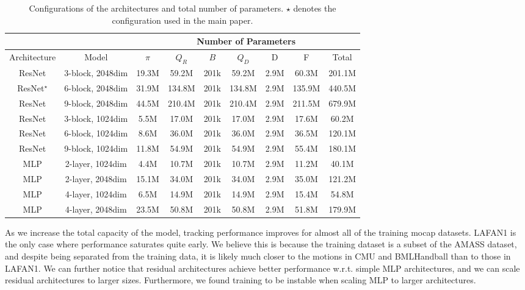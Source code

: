 \begin{table}[h]
\centering
\footnotesize
\begin{tabular}{|cc||cccccc|c|}
\hline
&& \multicolumn{7}{c|}{Number of Parameters}\\
\hline
Architecture & Model & $\pi$ & $Q_R$ & $B$ & $Q_D$ & D & F & Total\\
\hline
ResNet&3-block, 2048dim &19.3M&59.2M&201k&59.2M&2.9M&60.3M&201.1M\\
ResNet$^\star$&6-block, 2048dim &31.9M&134.8M&201k&134.8M&2.9M&135.9M&440.5M\\
ResNet&9-block, 2048dim &44.5M&210.4M&201k&210.4M&2.9M&211.5M&679.9M\\
ResNet&3-block, 1024dim &5.5M&17.0M&201k&17.0M&2.9M&17.6M&60.2M\\
ResNet&6-block, 1024dim &8.6M&36.0M&201k&36.0M&2.9M&36.5M&120.1M\\
ResNet&9-block, 1024dim &11.8M&54.9M&201k&54.9M&2.9M&55.4M&180.1M\\
\hline
MLP&2-layer, 1024dim &4.4M&10.7M&201k&10.7M&2.9M&11.2M&40.1M\\
MLP&2-layer, 2048dim &15.1M&34.0M&201k&34.0M&2.9M&35.0M&121.2M\\
MLP&4-layer, 1024dim &6.5M&14.9M&201k&14.9M&2.9M&15.4M&54.8M\\
MLP&4-layer, 2048dim &23.5M&50.8M&201k&50.8M&2.9M&51.8M&179.9M\\
\hline
\end{tabular}
\caption{Configurations of the architectures and total number of parameters. $\star$ denotes the configuration used in the main paper.}
\label{tab:config}
\end{table}

As we increase the total capacity of the model, tracking performance improves for almost all of the training mocap datasets. LAFAN1 is the only case where performance saturates quite early. We believe this is because the training dataset is a subset of the AMASS dataset, and despite being separated from the training data, it is likely much closer to the motions in CMU and BMLHandball than to those in LAFAN1. We can further notice that residual architectures achieve better performance w.r.t. simple MLP architectures, and we can scale residual architectures to larger sizes. Furthermore, we found training to be instable when scaling MLP to larger architectures.



